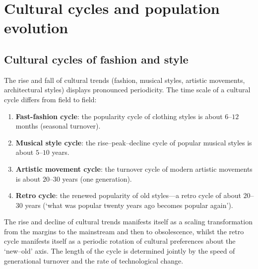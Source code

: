 \section{Cultural cycles and population evolution}

\subsection{Cultural cycles of fashion and style}

\begin{definition}\label{def:cultural_cycle}
The rise and fall of cultural trends (fashion, musical styles, artistic movements, architectural styles) displays pronounced periodicity. The time scale of a cultural cycle differs from field to field:
\begin{enumerate}[label=(\roman*)]
    \item \textbf{Fast-fashion cycle}: the popularity cycle of clothing styles is about $6$--$12$ months (seasonal turnover).
    \item \textbf{Musical style cycle}: the rise--peak--decline cycle of popular musical styles is about $5$--$10$ years.
    \item \textbf{Artistic movement cycle}: the turnover cycle of modern artistic movements is about $20$--$30$ years (one generation).
    \item \textbf{Retro cycle}: the renewed popularity of old styles---a retro cycle of about $20$--$30$ years (`what was popular twenty years ago becomes popular again').
\end{enumerate}
The rise and decline of cultural trends manifests itself as a scaling transformation from the margins to the mainstream and then to obsolescence, whilst the retro cycle manifests itself as a periodic rotation of cultural preferences about the `new--old' axis. The length of the cycle is determined jointly by the speed of generational turnover and the rate of technological change.
\end{definition}

